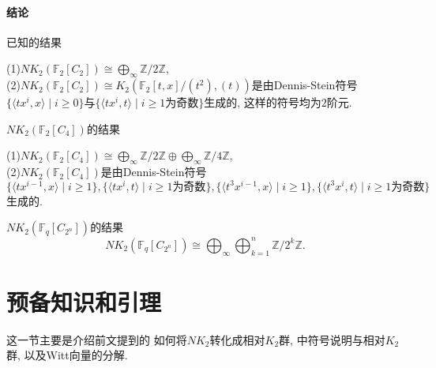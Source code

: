 \paragraph{结论} %
\label{par:结论}
已知的结果{\color{gray}
\begin{theorem*}
	(1)$NK_2(\mathbb{F}_2[C_2])\cong \bigoplus_{\infty} \mathbb{Z}/2 \mathbb{Z}$, \\
	(2)$NK_2(\mathbb{F}_2[C_2])\cong K_2(\mathbb{F}_2[t, x]/(t^2), (t))$是由Dennis-Stein符号$\{\langle tx^i, x \rangle \mid i\geq 0\}$与$\{\langle tx^i, t \rangle \mid i\geq 1\text{为奇数}\}$生成的, 这样的符号均为$2$阶元. 
\end{theorem*}
}
$NK_2(\mathbb{F}_2[C_4])$的结果
{\color{red}\begin{theorem*}
	(1)$NK_2(\mathbb{F}_2[C_4])\cong \bigoplus_{\infty} \mathbb{Z}/2 \mathbb{Z}\oplus \bigoplus_{\infty}\mathbb{Z}/4 \mathbb{Z}$, \\
	(2)$NK_2(\mathbb{F}_2[C_4])$是由Dennis-Stein符号
	\[\{\langle tx^{i-1}, x \rangle \mid i\geq 1\}, \{\langle tx^i, t \rangle \mid i\geq 1\text{为奇数}\}, \{\langle t^3x^{i-1}, x \rangle \mid i\geq 1\}, %
	\{\langle t^3x^i, t \rangle \mid i\geq 1\text{为奇数}\}\]
	生成的. 
\end{theorem*}}

$NK_2(\mathbb{F}_q[C_{2^n}])$的结果
{\color{red}\[NK_2(\mathbb{F}_q[C_{2^n}])\cong \bigoplus_\infty \bigoplus_{k=1}^n \mathbb{Z}/2^k\mathbb{Z}. \]}



























\section{预备知识和引理}
这一节主要是介绍前文提到的{\color{blue} 如何将$NK_2$转化成相对$K_2$群, \cite{MR86f:18017}中符号说明与相对$K_2$群, 以及Witt向量的分解}. 








